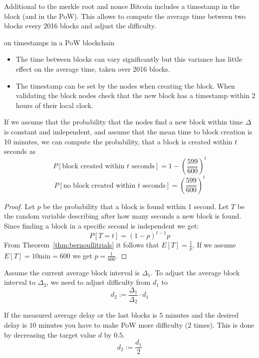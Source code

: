 \begin{definition}
Additional to the merkle root and nonce Bitcoin includes a timestamp in the	block (and in the PoW). This allows to compute the average time between two blocks every 2016 blocks and adjust the difficulty.
\end{definition}

\begin{note} on timestamps in a PoW blockchain
	
\begin{itemize}
	\item The time between blocks can vary significantly but this variance has little effect on the average time, taken over 2016 blocks.
	\item The timestamp can be set by the nodes when creating the block. When validating the block nodes check that the new block has a timestamp within 2 hours of their local clock.
\end{itemize}
\end{note}

\begin{lem}
	If we assume that the probability that the nodes find a new block within time $\Delta$ is constant and independent, and assume that the mean time to block creation is 10 minutes, we can compute the probability, that a block is created within $t$ seconds as
	\[
		P[\text{block created within } t \text{ seconds}] = 1- \left(\frac{599}{600} \right)^t
	\]
	\[
		P[\text{no block created within } t \text{ seconds}] = \left(\frac{599}{600} \right)^t
	\]
\end{lem}
\begin{proof}
Let $p$ be the probability that a block is found within 1 second.
Let $T$ be the random variable describing after how many seconds a new block is found. Since finding a block in a specific second is independent we get:
\[
P[T=t] = (1-p)^{t-1}p
\]
From Theorem~\ref{thm:bernoullitrials} it follows that $E[T] = \frac{1}{p}$.
If we assume $E[T]= 10 \text{min} = 600$ we get $p=\frac{1}{600}$.
\end{proof}

\begin{lem}
	Assume the current average block interval is $\Delta_1$. To adjust the average block interval to $\Delta_2$, we need to adjust difficulty from $d_1$ to
	\[
	d_2 := \frac{\Delta_1}{\Delta_2}\cdot d_1
	\]
	
\end{lem}

\begin{example}
	If the measured average delay or the last blocks is $5$ minutes and the desired delay is $10$ minutes you have to make PoW more difficulty (2 times). This is done by decreasing the target value $d$ by $0.5$.
	\[
		d_2 := \frac{d_1}{2}
	\]
	
\end{example}

